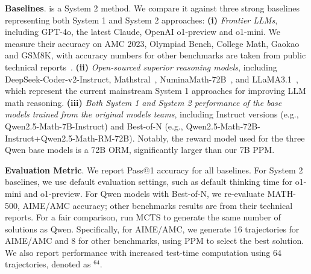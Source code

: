 \noindent\textbf{Baselines}.  {\sysname} is a System 2 method. We compare it against three strong baselines representing both System 1 and System 2 approaches: \textbf{(i)} \textit{Frontier LLMs}, including GPT-4o, the latest Claude, OpenAI o1-preview and o1-mini. 
 We measure their accuracy on AMC 2023, Olympiad Bench, College Math, Gaokao and GSM8K, with accuracy numbers for other benchmarks are taken from public technical reports~\citep{qwq-32b-preview}. 
\textbf{(ii)} \textit{Open-sourced superior reasoning models}, including DeepSeek-Coder-v2-Instruct, Mathstral~\citep{mathstral}, NuminaMath-72B~\citep{numina_math_datasets}, and LLaMA3.1~\citep{llama3.1}, which represent the current mainstream System 1 approaches for improving LLM math reasoning. \textbf{(iii)} \textit{Both System 1 and System 2 performance of the base models trained from the original models teams}, including Instruct versions (e.g., Qwen2.5-Math-7B-Instruct) and  Best-of-N (e.g., Qwen2.5-Math-72B-Instruct+Qwen2.5-Math-RM-72B).  Notably, the reward model used for the three Qwen base models is a 72B ORM, significantly larger than our 7B PPM.


\noindent\textbf{Evaluation Metric}. We report Pass@1 accuracy for all baselines. For System 2 baselines, we use default evaluation settings, such as default thinking time for o1-mini and o1-preview. For  Qwen models with Best-of-N, we re-evaluate  MATH-500, AIME/AMC accuracy; other benchmarks results are from their technical reports. For a fair comparison, {\sysname} run MCTS to generate the same number of solutions as Qwen. Specifically, for AIME/AMC, we generate 16 trajectories for AIME/AMC and 8 for other benchmarks, using PPM to select the best solution. We also report performance with increased test-time computation using 64 trajectories, denoted as {\sysname}$^{64}$.




